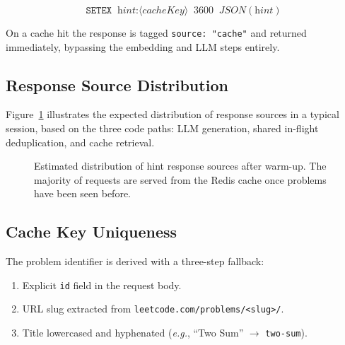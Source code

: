 \documentclass[11pt,a4paper]{article}
\begin{document}
\[
  \texttt{SETEX}\;\; \textit{hint:}\langle\mathit{cacheKey}\rangle \;\; 3600 \;\; \textit{JSON}(\textit{hint})
\]

On a cache hit the response is tagged \texttt{source: "cache"} and returned
immediately, bypassing the embedding and LLM steps entirely.

\subsection{Response Source Distribution}

Figure~\ref{fig:cachepie} illustrates the expected distribution of response
sources in a typical session, based on the three code paths: LLM generation,
shared in-flight deduplication, and cache retrieval.

\begin{figure}[H]
\centering
{}
\caption{Estimated distribution of hint response sources after warm-up.
  The majority of requests are served from the Redis cache once problems have
  been seen before.}
\label{fig:cachepie}
\end{figure}

\subsection{Cache Key Uniqueness}

The problem identifier is derived with a three-step fallback:

\begin{enumerate}[noitemsep]
  \item Explicit \texttt{id} field in the request body.
  \item URL slug extracted from \texttt{leetcode.com/problems/<slug>/}.
  \item Title lowercased and hyphenated (\emph{e.g.},
        ``Two Sum'' $\to$ \texttt{two-sum}).
\end{enumerate}
\end{document}
